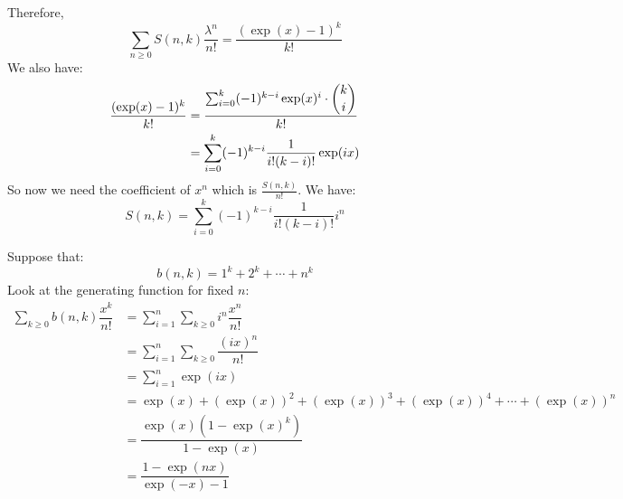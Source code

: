 \documentclass{report}
\begin{document}
\begin{examples}
\begin{example}
        Therefore,
            \begin{equation*}
                \sum_{n \geq 0}S(n, k)\dfrac{\lambda^{n}}{n!} = \dfrac{(\exp(x) - 1)^{k}}{k!}
            \end{equation*}
        We also have:
            \begin{align*}
                \dfrac{(\exp(x) - 1)^{k}}{k!} &= \dfrac{\sum_{i = 0}^{k}(-1)^{k - i}\exp(x)^{i} \cdot \dbinom{k}{i}}{k!} \\
                                              &= \sum_{i = 0}^{k} (-1)^{k - i}\dfrac{1}{i!(k - i)!}\exp(ix)           \\
            \end{align*}
        So now we need the coefficient of $x^{n}$ which is $\frac{S(n, k)}{n!}$. We have:
            \begin{equation*}
                S(n, k) = \sum_{i = 0}^{k}(-1)^{k - i}\dfrac{1}{i!(k - i)!}i^{n}
            \end{equation*}
    \end{example}
    \begin{example}
        Suppose that:
            \begin{equation*}
                b(n, k) = 1^{k} + 2^{k} + \cdots +n^{k}
            \end{equation*}
        Look at the generating function for fixed $n$:
            \begin{align*}
                \sum_{k \geq 0}b(n, k)\dfrac{x^{k}}{n!} &= \sum_{i = 1}^{n}\sum_{k \geq 0}i^{n}\dfrac{x^{n}}{n!
                }                             \\
                                                        &= \sum_{i = 1}^{n}\sum_{k \geq 0}\dfrac{(ix)^{n}}{n!}                              \\
                                                        &= \sum_{i = 1}^{n}\exp(ix)                                                         \\
                                                        &= \exp(x) + (\exp(x))^{2} + (\exp(x))^{3} + (\exp(x))^{4} + \cdots + (\exp(x))^{n} \\
                                                        &= \dfrac{\exp(x)(1 - \exp(x)^{k})}{1 - \exp(x)}                                    \\
                                                        &= \dfrac{1 - \exp(nx)}{\exp(-x) - 1}                                                 
            \end{align*}
    \end{example}
\end{examples}
\end{document}
